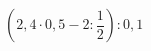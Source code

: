 \begin{ex}[type=calculate]
	\begin{condition}
		\( \left( 2,4\cdot0,5-2:\dfrac{1}{2} \right):0,1 \)
	\end{condition}
\end{ex}